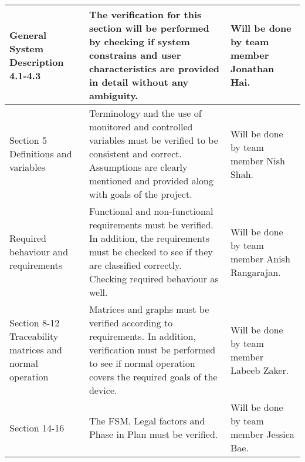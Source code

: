 \documentclass[12pt, titlepage]{article}
\begin{document}
\begin{center}
\begin{tabular}{|m{3cm}|m{8cm}|m{4cm}|}
    \hline
    General System Description 4.1-4.3                      & The verification for this section will be performed by checking if system constrains and user characteristics are provided in detail without any ambiguity.                                       & Will be done by team member Jonathan Hai.                                                    \\
    \hline
    Section 5 Definitions and variables                     &  Terminology and the use of monitored and controlled variables must be verified to be consistent and correct. Assumptions are clearly mentioned and provided along with goals of the project. & Will be done by team member  Nish Shah.                                                      \\
    \hline
    Required behaviour and requirements                      & Functional and non-functional requirements must be verified. In addition, the requirements must be checked to see if they are classified correctly. Checking required behaviour as well.                              & Will be done by team member Anish Rangarajan.                                                \\
    \hline
    Section 8-12 Traceability matrices and normal operation &  Matrices and graphs must be verified according to requirements. In addition, verification must be performed to see if normal operation covers the required goals of the device.                                         & Will be done by team member Labeeb Zaker.                                                    \\
    \hline
    Section 14-16                                           & The FSM, Legal factors and Phase in Plan must be verified.                                                                                                                                 & Will be done by team member Jessica Bae.                                                     \\
    \hline
  \end{tabular}
\end{center}

\end{document}
